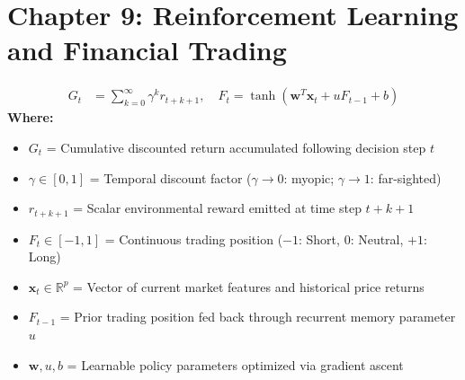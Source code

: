 \section*{Chapter 9: Reinforcement Learning and Financial Trading}

\begin{formulabox}
\begin{align*}
    G_t &= \sum_{k=0}^\infty \gamma^k r_{t+k+1}, \quad F_t = \tanh(\mathbf{w}^T \mathbf{x}_t + u F_{t-1} + b)
\end{align*}
\textbf{Where:}
\begin{itemize}[noitemsep, topsep=1pt]
    \item $G_t$ = Cumulative discounted return accumulated following decision step $t$
    \item $\gamma \in [0, 1]$ = Temporal discount factor ($\gamma \to 0$: myopic; $\gamma \to 1$: far-sighted)
    \item $r_{t+k+1}$ = Scalar environmental reward emitted at time step $t+k+1$
    \item $F_t \in [-1, 1]$ = Continuous trading position ($-1$: Short, $0$: Neutral, $+1$: Long)
    \item $\mathbf{x}_t \in \mathbb{R}^p$ = Vector of current market features and historical price returns
    \item $F_{t-1}$ = Prior trading position fed back through recurrent memory parameter $u$
    \item $\mathbf{w}, u, b$ = Learnable policy parameters optimized via gradient ascent
\end{itemize}
\end{formulabox}

